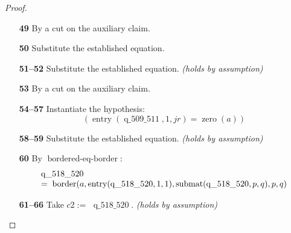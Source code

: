\documentclass[11pt]{article}
\theoremstyle{plain}
\begin{document}
\begin{proof}
\begin{itemize}[leftmargin=2.8em, itemsep=4pt, parsep=1pt]
  \item[\textbf{49}] By a cut on the auxiliary claim.
  \item[\textbf{50}] Substitute the established equation.
  \item[\textbf{51--52}] Substitute the established equation.  \emph{(holds by assumption)}
  \item[\textbf{53}] By a cut on the auxiliary claim.
  \item[\textbf{54--57}] Instantiate the hypothesis:
\begin{equation*}
(\operatorname{entry}(\operatorname{q\_509\_511}, 1, \mathit{jr}) = \operatorname{zero}(a))
\end{equation*}

  \item[\textbf{58--59}] Substitute the established equation.  \emph{(holds by assumption)}
  \item[\textbf{60}] By $\operatorname{bordered\text{-}eq\text{-}border}$:
\begin{equation*}
\begin{array}{@{}l@{}} \operatorname{q\_518\_520} \\ =\; \operatorname{border}(a, \operatorname{entry}(\operatorname{q\_518\_520}, 1, 1), \operatorname{submat}(\operatorname{q\_518\_520}, p, q), p, q) \end{array}
\end{equation*}

  \item[\textbf{61--66}] Take $\mathit{c2} :=$ $\operatorname{q\_518\_520}$.  \emph{(holds by assumption)}
\end{itemize}
\end{proof}
\end{document}
